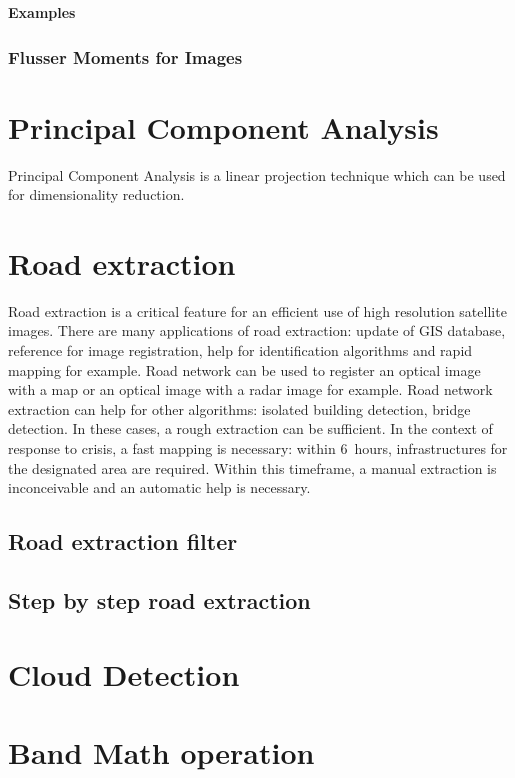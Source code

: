 \textbf{Examples}
\subsubsection{Flusser Moments for Images}

%

\section{Principal Component Analysis}
Principal Component Analysis is a linear projection technique which
can be used for dimensionality reduction.


\section{Road extraction}
\label{sec:RoadExtraction}

Road extraction is a critical feature for an efficient use of high resolution satellite images. There are many applications of road extraction: update of GIS database, reference for image registration, help for identification algorithms and rapid mapping for example.  Road network can be used to register an optical image with a map or an optical image with a radar image for example. Road network extraction can help for other algorithms: isolated building detection, bridge detection. In these cases, a rough extraction can be sufficient. In the context of response to crisis, a fast mapping is necessary: within 6~hours, infrastructures for the designated area are required. Within this timeframe, a manual extraction is inconceivable and an automatic help is necessary.

\subsection{Road extraction filter}



\subsection{Step by step road extraction}




%
% 
%
% 

\section{Cloud Detection}


\section{Band Math operation}

